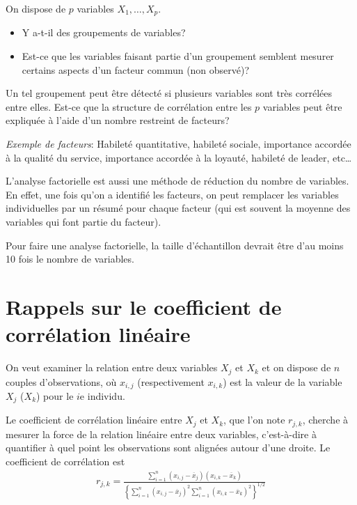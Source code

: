 \documentclass[
]{book}
\providecommand{\tightlist}{%
  \setlength{\itemsep}{0pt}\setlength{\parskip}{0pt}}
\theoremstyle{definition}
\theoremstyle{definition}
\theoremstyle{definition}
\theoremstyle{remark}
\begin{document}
On dispose de \(p\) variables \(X_1, \ldots, X_p\).

\begin{itemize}
\tightlist
\item
  Y a-t-il des groupements de variables?
\item
  Est-ce que les variables faisant partie d'un groupement semblent mesurer certains aspects d'un facteur commun (non observé)?
\end{itemize}

Un tel groupement peut être détecté si plusieurs variables sont très corrélées entre elles. Est-ce que la structure de corrélation entre les \(p\) variables peut être expliquée à l'aide d'un nombre restreint de facteurs?

\emph{Exemple de facteurs}: Habileté quantitative, habileté sociale, importance accordée à la qualité du service, importance accordée à la loyauté, habileté de leader, etc\ldots

L'analyse factorielle est aussi une méthode de réduction du nombre de variables. En effet, une fois qu'on a identifié les facteurs, on peut remplacer les variables individuelles par un résumé pour chaque facteur (qui est souvent la moyenne des variables qui font partie du facteur).

Pour faire une analyse factorielle, la taille d'échantillon devrait être d'au moins 10 fois le nombre de variables.

\hypertarget{rappels-sur-le-coefficient-de-corruxe9lation-linuxe9aire}{%
\section{Rappels sur le coefficient de corrélation linéaire}\label{rappels-sur-le-coefficient-de-corruxe9lation-linuxe9aire}}

On veut examiner la relation entre deux variables \(X_j\) et \(X_k\) et on dispose de \(n\) couples d'observations, où \(x_{i, j}\) (respectivement \(x_{i, k}\)) est la valeur de la variable \(X_j\) (\(X_k\)) pour le \(i\)e individu.

Le coefficient de corrélation linéaire entre \(X_j\) et \(X_k\), que l'on note \(r_{j, k}\), cherche à mesurer la force de la relation linéaire entre deux variables, c'est-à-dire à quantifier à quel point les observations sont alignées autour d'une droite. Le coefficient de corrélation est
\begin{align*}
r_{j, k} = \frac{\sum_{i=1}^n (x_{i, j}-\overline{x}_j)(x_{i, k} -\overline{x}_{k})}{\left\{\sum_{i=1}^n (x_{i, j}-\overline{x}_j)^2 \sum_{i=1}^n(x_{i, k} -\overline{x}_{k})^2\right\}^{1/2}}
\end{align*}
\end{document}
